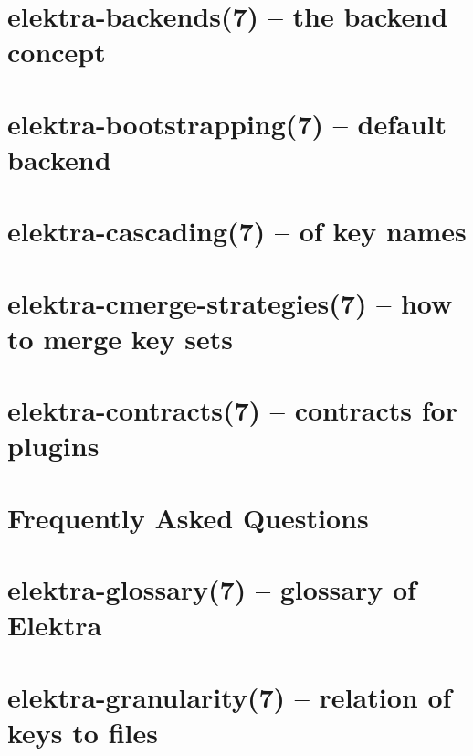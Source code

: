 \let\mypdfximage\pdfximage\def\pdfximage{\immediate\mypdfximage}\documentclass[twoside]{book}
\newcommand{\+}{\discretionary{\mbox{\scriptsize$\hookleftarrow$}}{}{}}
\begin{document}
\chapter{elektra-\/backends(7) -- the backend concept}
\label{doc_help_elektra-backends_md}

\chapter{elektra-\/bootstrapping(7) -- default backend}
\label{doc_help_elektra-bootstrapping_md}

\chapter{elektra-\/cascading(7) -- of key names}
\label{doc_help_elektra-cascading_md}

\chapter{elektra-\/cmerge-\/strategies(7) -- how to merge key sets}
\label{doc_help_elektra-cmerge-strategy_md}

\chapter{elektra-\/contracts(7) -- contracts for plugins}
\label{doc_help_elektra-contracts_md}

\chapter{Frequently Asked Questions}
\label{doc_help_elektra-faq_md}

\chapter{elektra-\/glossary(7) -- glossary of Elektra}
\label{doc_help_elektra-glossary_md}

\chapter{elektra-\/granularity(7) -- relation of keys to files}
\label{doc_help_elektra-granularity_md}

\end{document}
